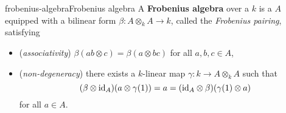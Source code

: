 
\begin{topic}{frobenius-algebra}{Frobenius algebra}
    A \textbf{Frobenius algebra} over a  $k$ is a  $A$ equipped with a bilinear form $\beta : A \otimes_k A \to k$, called the \textit{Frobenius pairing}, satisfying
    \begin{itemize}
        \item (\textit{associativity}) $\beta(ab \otimes c) = \beta(a \otimes bc)$ for all $a, b, c \in A$,
        \item (\textit{non-degeneracy}) there exists a $k$-linear map $\gamma : k \to A \otimes_k A$ such that 
        \[ (\beta \otimes \textup{id}_A)(a \otimes \gamma(1)) = a = (\textup{id}_A \otimes \beta)(\gamma(1) \otimes a) \]
        for all $a \in A$.
    \end{itemize}
\end{topic}

